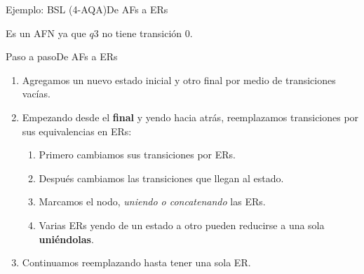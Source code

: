 \documentclass[spanish]{beamer}
\begin{document}
\begin{frame}{Ejemplo: BSL (4-AQA)}{De AFs a ERs}
    \begin{center}
    \end{center} \pause

    Es un AFN ya que $q3$ no tiene transición $0$.
\end{frame}

\begin{frame}{Paso a paso}{De AFs a ERs}
    \begin{enumerate}
        \itemsep1.5em
        \item Agregamos un nuevo estado inicial y otro final por medio de transiciones vacías. \pause
        \item Empezando desde el \textbf{final} y yendo hacia atrás, reemplazamos transiciones por sus equivalencias en ERs: \pause
        \begin{enumerate}
            \itemsep1.1em
            \item Primero cambiamos sus transiciones por ERs. \pause
            \item Después cambiamos las transiciones que llegan al estado. \pause
            \item Marcamos el nodo, \textit{uniendo o concatenando} las ERs. \pause
            \item Varias ERs yendo de un estado a otro pueden reducirse a una sola \textbf{uniéndolas}. \pause
        \end{enumerate}
        \item Continuamos reemplazando hasta tener una sola ER.
    \end{enumerate}
\end{frame}
\end{document}
